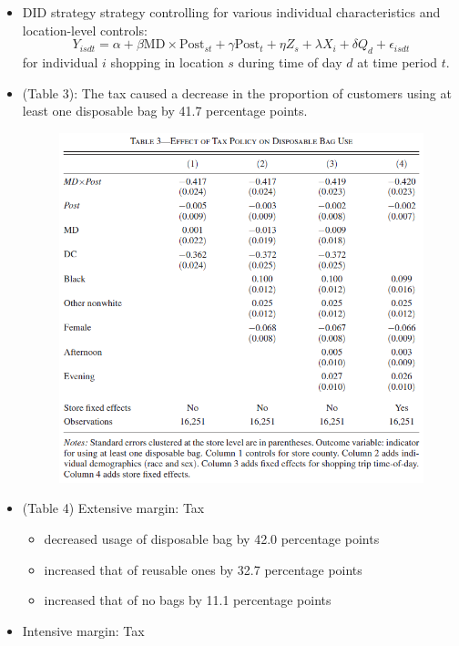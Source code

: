 \documentclass[../root]{subfiles}
\begin{document}
    \begin{itemize}
      \item DID strategy strategy controlling for various individual characteristics and location-level controls:
      \[
      Y_{isdt} = \alpha + \beta \text{MD} \times \text{Post}_{st} + \gamma \text{Post}_{t} + \eta Z_s + \lambda X_i + \delta Q_d + \epsilon_{isdt}
      \]
      for individual $i$ shopping in location $s$ during time of day $d$ at time period $t$.
      \item (Table 3): The tax caused a decrease in the proportion of customers using at least one disposable bag by 41.7 percentage points.
      \begin{figure}[ht]
        \centering
        \includegraphics[scale = .8]{0807tanji/T3}
      \end{figure}
      \item (Table 4) Extensive margin: Tax
      \begin{itemize}
        \item decreased usage of disposable bag by 42.0 percentage points
        \item increased that of reusable ones by 32.7 percentage points
        \item increased that of no bags by 11.1 percentage points
      \end{itemize}
      \item Intensive margin: Tax

\end{itemize}
\end{document}
